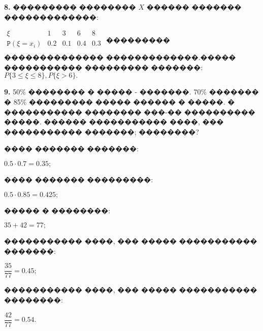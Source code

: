 \documentclass{article}
\begin{document}
\textbf{8.} ��������� �������� $X$ ������ ������� �������������:

$\begin{array}{c|cccc}
\xi&1&3&6&8\\ \hline
\texttt{P}(\xi=x_i)&0.2&0.1&0.4&0.3\\
\end{array}$ ��������� �������������� �������������.����� ����������� ��������� �������: $P\{3\leq\xi\leq8\},P\{\xi>6\}. $

\textbf{9.} 50\% �������� � ����� - �������. 70\% ������� � 85\% ��������� ����� ������ � �����. � ����������� �������� ���-�� ���������� �����. ������ ����������� ����, ��� ����������� �������; ��������?

���� ������� �������:

$0.5\cdot0.7=0.35;$

���� ������� ���������:

$0.5\cdot0.85=0.425;$

����� � ��������:

$35+42=77;$

����������� ����, ��� ����� ����������� �������:

$\dfrac{35}{77}=0.45; $

����������� ����, ��� ����� ����������� ��������:

$\dfrac{42}{77}=0.54. $
\end{document}
